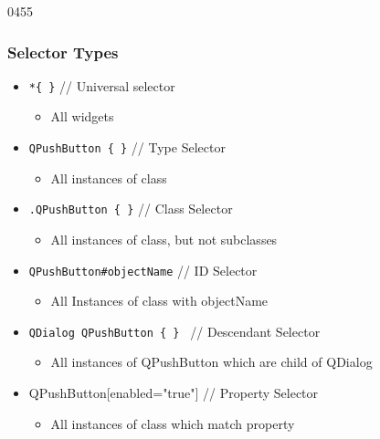\begin{slide}{0455}\frametitle{Selector Types}
\begin{itemize}
\item \texttt{*\{ \}} // Universal selector
  \begin{itemize}
  \item All widgets
  \end{itemize}
\item \texttt{QPushButton \{ \}} // Type Selector
  \begin{itemize}
  \item All instances of class
  \end{itemize}
\item\texttt{.QPushButton \{ \}} // Class Selector
  \begin{itemize}
  \item All instances of class, but not subclasses
  \end{itemize}
\item \texttt{QPushButton\#objectName} // ID Selector
  \begin{itemize}
  \item All Instances of class with objectName
  \end{itemize}
\item\texttt{QDialog QPushButton \{ \} } // Descendant Selector
  \begin{itemize}
  \item All instances of QPushButton which are child of QDialog
  \end{itemize}
\item QPushButton[enabled="true"] // Property Selector
  \begin{itemize}
  \item All instances of class which match property
  \end{itemize}
\end{itemize}
\end{slide}


